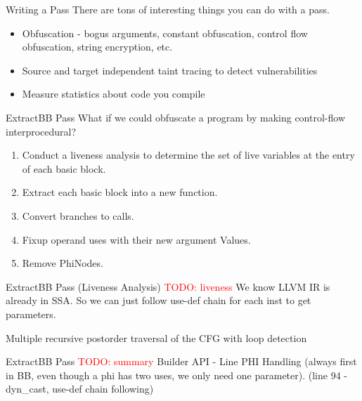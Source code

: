 \documentclass{beamer}
\newcommand{\todo}[1]{\textcolor{red}{TODO: #1}}
\begin{document}

\begin{frame}{Writing a Pass}
    There are tons of interesting things you can do with a pass.
    \begin{itemize}
        \item Obfuscation - bogus arguments, constant obfuscation, control flow obfuscation, string encryption, etc.
        \item Source and target independent taint tracing to detect vulnerabilities
        \item Measure statistics about code you compile
    \end{itemize}
\end{frame}


\begin{frame}{ExtractBB Pass}
    What if we could obfuscate a program by making control-flow interprocedural?

    \pause
    \begin{enumerate}
        \item Conduct a liveness analysis to determine the set of live variables at the entry of each basic block.
        \pause
        \item Extract each basic block into a new function.
        \pause
        \item Convert branches to calls.
        \pause
        \item Fixup operand uses with their new argument Values.
        \pause
        \item Remove PhiNodes.
    \end{enumerate}
\end{frame}

\begin{frame}{ExtractBB Pass (Liveness Analysis)}
    \todo{liveness}
    We know LLVM IR is already in SSA. So we can just follow use-def chain for each inst to get parameters.

    Multiple recursive postorder traversal of the CFG with loop detection
\end{frame}

\begin{frame}{ExtractBB Pass}
    \todo{summary}
    Builder API - Line
    PHI Handling (always first in BB, even though a phi has two uses, we only need one parameter). (line 94 - dyn\_cast, use-def chain following)
\end{frame}
\end{document}
